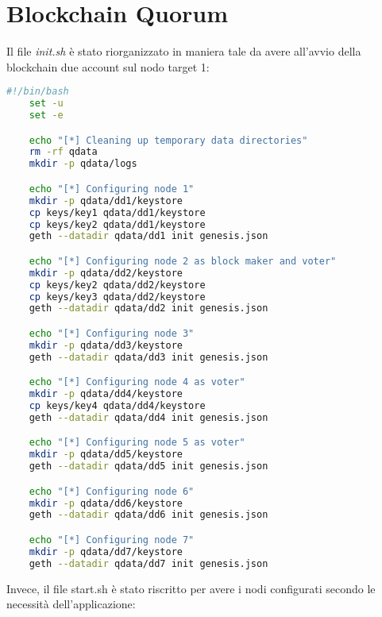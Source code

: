 \section{Blockchain Quorum}
%
\label{cap:quorumCode}
%
Il file \emph{init.sh} è stato riorganizzato in maniera tale da avere all'avvio della blockchain due account sul nodo target 1:
\begin{center}
	\begin{lstlisting}[language=sh,caption={Script di inizializzazione della blockchain Quorum},captionpos=b,frame=lines,basicstyle=\linespread{0.8}\small]
	#!/bin/bash
	set -u
	set -e

	echo "[*] Cleaning up temporary data directories"
	rm -rf qdata
	mkdir -p qdata/logs

	echo "[*] Configuring node 1"
	mkdir -p qdata/dd1/keystore
	cp keys/key1 qdata/dd1/keystore
	cp keys/key2 qdata/dd1/keystore
	geth --datadir qdata/dd1 init genesis.json

	echo "[*] Configuring node 2 as block maker and voter"
	mkdir -p qdata/dd2/keystore
	cp keys/key2 qdata/dd2/keystore
	cp keys/key3 qdata/dd2/keystore
	geth --datadir qdata/dd2 init genesis.json

	echo "[*] Configuring node 3"
	mkdir -p qdata/dd3/keystore
	geth --datadir qdata/dd3 init genesis.json

	echo "[*] Configuring node 4 as voter"
	mkdir -p qdata/dd4/keystore
	cp keys/key4 qdata/dd4/keystore
	geth --datadir qdata/dd4 init genesis.json

	echo "[*] Configuring node 5 as voter"
	mkdir -p qdata/dd5/keystore
	geth --datadir qdata/dd5 init genesis.json

	echo "[*] Configuring node 6"
	mkdir -p qdata/dd6/keystore
	geth --datadir qdata/dd6 init genesis.json

	echo "[*] Configuring node 7"
	mkdir -p qdata/dd7/keystore
	geth --datadir qdata/dd7 init genesis.json
	\end{lstlisting}
\end{center}
Invece, il file start.sh è stato riscritto per avere i nodi configurati secondo le necessità dell'applicazione:

